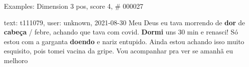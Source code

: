 \begin{frame}{Examples: Dimension 3 pos, score 4, \# 000027}
\footnotesize
\begin{exampleblock}{text: t111079, user: unknown, 2021-08-30}
Meu Deus eu tava morrendo de \textbf{dor} de \textbf{cabeça} / febre, achando 
que tava com covid. \textbf{Dormi} uns 30 min e renasci! Só estou com a 
garganta \textbf{doendo} e nariz entupido. Ainda estou achando isso muito 
esquisito, pois tomei vacina da gripe. Vou acompanhar pra ver se amanhã eu 
melhoro 
\end{exampleblock}
\end{frame}
